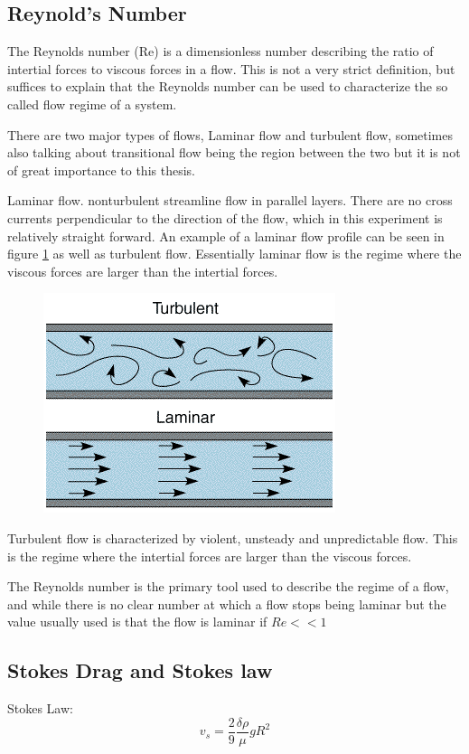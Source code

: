 \documentclass[]{report}
\begin{document}
\subsection{Reynold's Number}
The Reynolds number (Re) is a dimensionless number describing the ratio of intertial forces to viscous forces in a flow. This is not a very strict definition, but suffices to explain that the Reynolds number can be used to characterize the so called flow regime of a system. 

There are two major types of flows, Laminar flow and turbulent flow, sometimes also talking about transitional flow being the region between the two but it is not of great importance to this thesis. 

Laminar flow. nonturbulent streamline flow in parallel layers. There are no cross currents perpendicular to the direction of the flow, which in this experiment is relatively straight forward. An example of a laminar flow profile can be seen in figure \ref{fig:laminar_flow} as well as turbulent flow. Essentially laminar flow is the regime where the viscous forces are larger than the intertial forces.

\begin{figure}\label{fig:laminar_flow}
\includegraphics{Images/laminarFlow.png}
\end{figure}

Turbulent flow is characterized by violent, unsteady and unpredictable flow. This is the regime where the intertial forces are larger than the viscous forces.

The Reynolds number is the primary tool used to describe the regime of a flow, and while there is no clear number at which a flow stops being laminar but the value usually used is that the flow is laminar if $Re << 1$
\subsection{Stokes Drag and Stokes law}
Stokes Law:
\begin{equation}
v_s = \frac{2}{9} \frac{\delta \rho}{\mu} g R^2
\end{equation}
\end{document}
